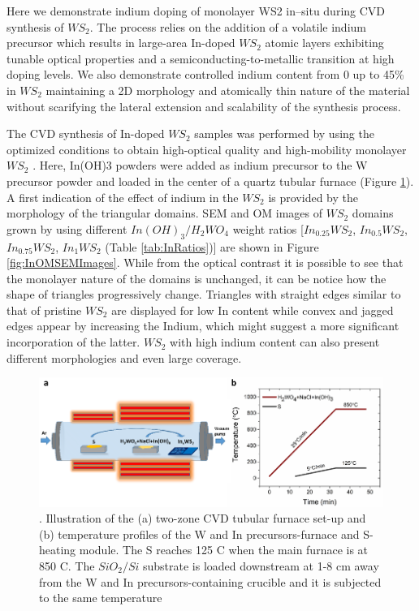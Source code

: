 Here we demonstrate indium doping of monolayer WS2 in–situ during CVD synthesis of $WS_2$. The process relies on the addition of a volatile indium precursor which results in large-area In-doped $WS_2$ atomic layers exhibiting tunable optical properties and a semiconducting-to-metallic transition at high doping levels. We also demonstrate controlled indium content from 0 up to 45\% in $WS_2$ maintaining a 2D morphology and atomically thin nature of the material without scarifying the lateral extension and scalability of the synthesis process.

The CVD synthesis of In-doped $WS_2$ samples was performed by using the optimized conditions to obtain high-optical quality and high-mobility monolayer $WS_2$ \cite{Reale2017}. Here, In(OH)3 powders were added as indium precursor to the W precursor powder and loaded in the center of a quartz tubular furnace (Figure \ref{fig:InFurnaceSetup}). A first indication of the effect of indium in the $WS_2$ is provided by the morphology of the triangular domains. SEM and OM images of $WS_2$ domains grown by using different $In(OH)_3/H_2WO_4$ weight ratios [$In_{0.25}WS_2$, $In_{0.5}WS_2$, $In_{0.75}WS_2$, $In_1WS_2$ (Table \ref{tab:InRatios})] are shown in Figure \ref{fig:InOMSEMImages}. While from the optical contrast it is possible to see that the monolayer nature of the domains is unchanged, it can be notice how the shape of triangles progressively change. Triangles with straight edges similar to that of pristine $WS_2$ are displayed for low In content while convex and jagged edges appear by increasing the Indium, which might suggest a more significant incorporation of the latter. $WS_2$ with high indium content can also present different morphologies and even large coverage.

\begin{figure}[!h]
	\begin{center}
		\includegraphics[scale=0.5]{In/FurnaceSetup.png}
		\caption{. Illustration of the (a) two-zone CVD tubular furnace set-up and (b) temperature profiles of the W and In precursors-furnace and S-heating module. The S reaches 125 {\degree}C when the main furnace is at 850 {\degree}C. The $SiO_2/Si$ substrate is loaded downstream at 1-8 cm away from the W and In precursors-containing crucible and it is subjected to the same temperature}
		\label{fig:InFurnaceSetup}
	\end{center}
\end{figure}

